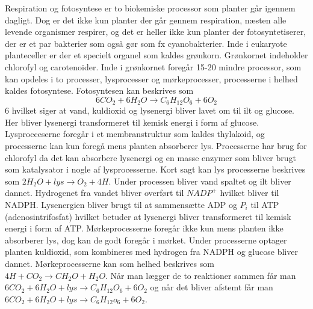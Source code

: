 Respiration og fotosyntese er to biokemiske processor som planter går igennem dagligt. Dog er det ikke kun planter der går gennem respiration, næsten alle levende organismer respirer, og det er heller ikke kun planter der fotosyntetiserer, der er et par bakterier som også gør som fx cyanobakterier.
Inde i eukaryote planteceller er der et specielt organel som kaldes grønkorn. Grønkornet indeholder chlorofyl og carotenoider. Inde i grønkornet foregår 15-20 mindre processor, som kan opdeles i to processer, lysprocesser og mørkeprocesser, processerne i helhed kaldes fotosyntese. Fotosyntesen kan beskrives som \begin{equation} 6CO_2 + 6H_2O \rightarrow C_6H_{12}O_6 + 6O_2 \end{equation}6 hvilket siger at vand, kuldioxid og lysenergi bliver lavet om til ilt og glucose. Her bliver lysenergi transformeret til kemisk energi i form af glucose. 
Lysprocceserne foregår i et membranstruktur som kaldes thylakoid, og processerne kan kun foregå mens planten absorberer lys. 
Processerne har brug for chlorofyl da det kan absorbere lysenergi og en masse enzymer som bliver brugt som katalysator i nogle af lysprocesserne. Kort sagt kan lys processerne beskrives som 
\begin{math}
    2H_2 O+lys \rightarrow O_2+4H
\end{math}. Under processen bliver vand spaltet og ilt bliver dannet. 
Hydrogenet fra vandet bliver overført til \begin{math}NADP^+\end{math} hvilket bliver til NADPH. Lysenergien bliver brugt til at sammensætte ADP og \begin{math}P_i\end{math} til ATP (adenosintrifosfat) hvilket betuder at lysenergi bliver transformeret til kemisk energi i form af ATP. 
Mørkeprocesserne foregår ikke kun mens planten ikke absorberer lys, dog kan de godt foregår i mørket. Under processerne optager planten kuldioxid, som kombineres med hydrogen fra NADPH og glucose bliver dannet. Mørkeprocesserne kan som helhed beskrives som \begin{math}4H+CO_2 \rightarrow CH_2 O+H_2 O\end{math}.
Når man lægger de to reaktioner sammen får man \begin{math}
    6CO_2+6H_2 O+lys \rightarrow C_6 H_{12} O_6+6O_2
\end{math}  og når det bliver afstemt får man  \begin{math}6CO_2+6H_2 O+lys \rightarrow C_6 H_12 o_6+6O_2\end{math}.

